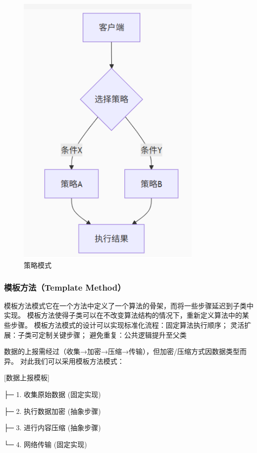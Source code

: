 \documentclass[12pt]{ctexart} %
\begin{document}
\begin{figure}[H]
  \centering
  \includegraphics[width=0.8\textwidth]{celv.png}
  \caption{策略模式}
\end{figure}
\subsubsection{模板方法（Template Method）} 
模板方法模式它在一个方法中定义了一个算法的骨架，而将一些步骤延迟到子类中实现。
模板方法使得子类可以在不改变算法结构的情况下，重新定义算法中的某些步骤。
模板方法模式的设计可以实现标准化流程：固定算法执行顺序；
灵活扩展：子类可定制关键步骤；
避免重复：公共逻辑提升至父类

数据的上报需经过（收集→加密→压缩→传输），但加密/压缩方式因数据类型而异。
对此我们可以采用模板方法模式：

[数据上报模板]

├─ 1. 收集原始数据 (固定实现)

├─ 2. 执行数据加密 (抽象步骤)

├─ 3. 进行内容压缩 (抽象步骤)

└─ 4. 网络传输 (固定实现)
\end{document}
